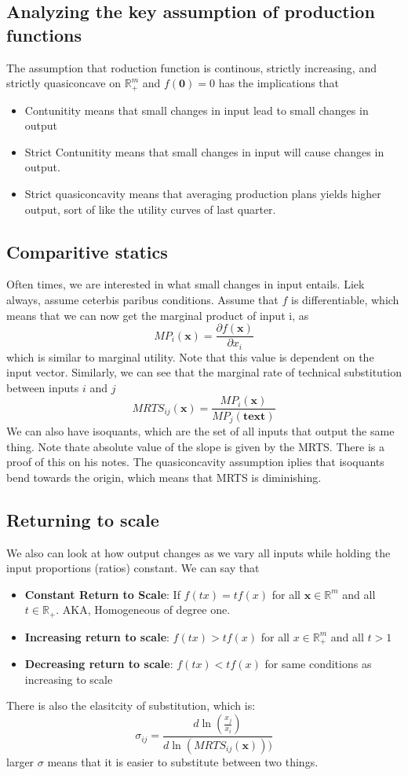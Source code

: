 \documentclass[12pt]{article}
\newcommand{\R}{\mathbb{R}}
\begin{document}
\subsection{Analyzing the key assumption of production functions}
The assumption that roduction function is continous, strictly increasing, and strictly quasiconcave on $\R_+^m$ and $f(\mathbf{0}) = 0$ has the implications that 
\begin{itemize}
    \item Contunitity means that small changes in input lead to small changes in output
    \item Strict Contunitity means that small changes in input will cause changes in output. 
    \item Strict quasiconcavity means that averaging production plans yields higher output, sort of like the utility curves of last quarter.
\end{itemize}
\subsection{Comparitive statics}
Often times, we are interested in what small changes in input entails. Liek always, assume ceterbis paribus conditions. Assume that $f$ is differentiable, which means that we can now get the marginal product of input i, as 
\[
MP_i(\mathbf{x}) = \frac{\partial f(\mathbf{x})}{\partial x_i}
\]
which is similar to marginal utility. Note that this value is dependent on the input vector. Similarly, we can see that the marginal rate of technical substitution between inputs $i$ and $j$
\[
MRTS_{ij}(\mathbf{x}) = \frac{MP_i(\mathbf{x})}{MP_j(\mathbf{text})}
\]
We can also have isoquants, which are the set of all inputs that output the same thing. Note thate absolute value of the slope is given by the MRTS. There is a proof of this on his notes. The quasiconcavity assumption iplies that isoquants bend towards the origin, which means that MRTS is diminishing. 
\subsection{Returning to scale}
We also can look at how output changes as we vary all inputs while holding the input proportions (ratios) constant. We can say that 
\begin{itemize}
    \item \textbf{Constant Return to Scale}: If $f(tx) = tf(x)$ for all $\mathbf{x} \in \R^m$ and all $t \in \R_+$. AKA, Homogeneous of degree one. 
    \item \textbf{Increasing return to scale}: $f(tx) > tf(x)$ for all $x \in \R^m_+$ and all $t > 1$
    \item \textbf{Decreasing return to scale}: $f(tx) < tf(x)$ for same conditions as increasing to scale
\end{itemize}
There is also the elasitcity of substitution, which is: 
\[
\sigma_{ij} = \frac{d \ln \left( \frac{x_j}{x_i} \right)}{d \ln(MRTS_{ij}(\mathbf{x})))}
\]
larger $\sigma$ means that it is easier to substitute between two things.   
\end{document}
